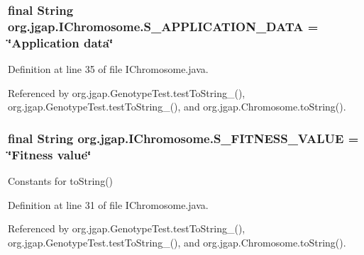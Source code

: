 \hypertarget{interfaceorg_1_1jgap_1_1_i_chromosome_a03218ba49e2c53108005cd6290252284}{
\subsubsection[{S\-\_\-\-A\-P\-P\-L\-I\-C\-A\-T\-I\-O\-N\-\_\-\-D\-A\-T\-A}]{\setlength{\rightskip}{0pt plus 5cm}final String org.\-jgap.\-I\-Chromosome.\-S\-\_\-\-A\-P\-P\-L\-I\-C\-A\-T\-I\-O\-N\-\_\-\-D\-A\-T\-A = \char`\"{}Application data\char`\"{}\hspace{0.3cm}{\ttfamily [static]}}}\label{interfaceorg_1_1jgap_1_1_i_chromosome_a03218ba49e2c53108005cd6290252284}


Definition at line 35 of file I\-Chromosome.\-java.



Referenced by org.\-jgap.\-Genotype\-Test.\-test\-To\-String\-\_(), org.\-jgap.\-Genotype\-Test.\-test\-To\-String\-\_(), and org.\-jgap.\-Chromosome.\-to\-String().

\hypertarget{interfaceorg_1_1jgap_1_1_i_chromosome_a34c8c0933688a10837692d1c0024f663}{
\subsubsection[{S\-\_\-\-F\-I\-T\-N\-E\-S\-S\-\_\-\-V\-A\-L\-U\-E}]{\setlength{\rightskip}{0pt plus 5cm}final String org.\-jgap.\-I\-Chromosome.\-S\-\_\-\-F\-I\-T\-N\-E\-S\-S\-\_\-\-V\-A\-L\-U\-E = \char`\"{}Fitness value\char`\"{}\hspace{0.3cm}{\ttfamily [static]}}}\label{interfaceorg_1_1jgap_1_1_i_chromosome_a34c8c0933688a10837692d1c0024f663}
Constants for to\-String() 

Definition at line 31 of file I\-Chromosome.\-java.



Referenced by org.\-jgap.\-Genotype\-Test.\-test\-To\-String\-\_(), org.\-jgap.\-Genotype\-Test.\-test\-To\-String\-\_(), and org.\-jgap.\-Chromosome.\-to\-String().

